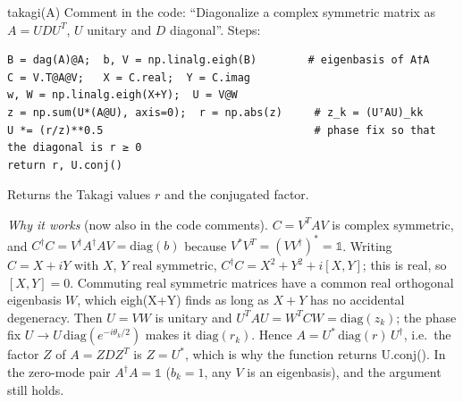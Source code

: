 \documentclass[11pt]{article}
\newcommand{\codeus}{\textunderscore\allowbreak}
\renewcommand{\code}[1]{{\ttfamily\let\_\codeus #1}}
\begin{document}
\begin{function}{takagi(A)}
Comment in the code: ``Diagonalize a complex symmetric matrix as $A=UDU^T$, $U$ unitary and $D$ diagonal''. Steps:
\begin{Verbatim}
B = dag(A)@A;  b, V = np.linalg.eigh(B)        # eigenbasis of A†A
C = V.T@A@V;   X = C.real;  Y = C.imag
w, W = np.linalg.eigh(X+Y);  U = V@W
z = np.sum(U*(A@U), axis=0);  r = np.abs(z)     # z_k = (UᵀAU)_kk
U *= (r/z)**0.5                                 # phase fix so that the diagonal is r ≥ 0
return r, U.conj()
\end{Verbatim}
Returns the Takagi values $r$ and the conjugated factor.

\emph{Why it works} (now also in the code comments). $C=V^TAV$ is complex symmetric, and
$C^\dagger C=V^\dagger A^\dagger A V=\mathrm{diag}(b)$ because $V^*V^T=(VV^\dagger)^*=\mathbb 1$. Writing $C=X+iY$ with $X$, $Y$ real symmetric,
$C^\dagger C=X^2+Y^2+i[X,Y]$; this is real, so $[X,Y]=0$. Commuting real symmetric matrices have a common real orthogonal eigenbasis $W$, which
\code{eigh(X+Y)} finds as long as $X+Y$ has no accidental degeneracy. Then $U=VW$ is unitary and $U^TAU=W^TCW=\mathrm{diag}(z_k)$; the phase
fix $U\to U\,\mathrm{diag}(e^{-i\theta_k/2})$ makes it $\mathrm{diag}(r_k)$. Hence $A=U^*\,\mathrm{diag}(r)\,U^\dagger$, i.e.\ the factor $Z$ of
$A=ZDZ^T$ is $Z=U^*$, which is why the function returns \code{U.conj()}. In the zero-mode pair $A^\dagger A=\mathbb 1$ ($b_k=1$, any $V$ is
an eigenbasis), and the argument still holds.
\end{function}
\end{document}
